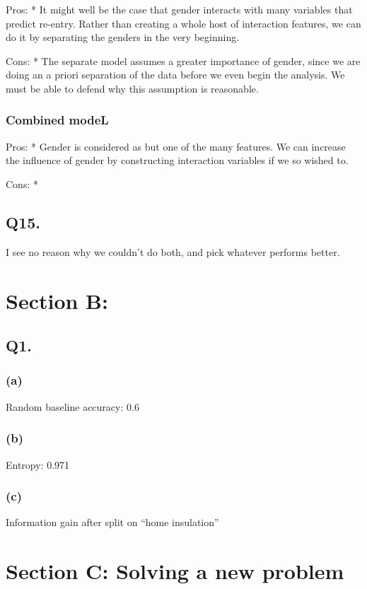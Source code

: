 \documentclass[]{article}
\begin{document}
Pros: * It might well be the case that gender interacts with many
variables that predict re-entry. Rather than creating a whole host of
interaction features, we can do it by separating the genders in the very
beginning.

Cons: * The separate model assumes a greater importance of gender, since
we are doing an a priori separation of the data before we even begin the
analysis. We must be able to defend why this assumption is reasonable.

\hypertarget{combined-model}{%
\subsubsection{Combined modeL}\label{combined-model}}

Pros: * Gender is considered as but one of the many features. We can
increase the influence of gender by constructing interaction variables
if we so wished to.

Cons: *

\hypertarget{q15.}{%
\subsection{Q15.}\label{q15.}}

I see no reason why we couldn't do both, and pick whatever performs
better.

\hypertarget{section-b}{%
\section{Section B:}\label{section-b}}

\hypertarget{q1.-1}{%
\subsection{Q1.}\label{q1.-1}}

\hypertarget{a}{%
\subsubsection{(a)}\label{a}}

Random baseline accuracy: 0.6

\hypertarget{b}{%
\subsubsection{(b)}\label{b}}

Entropy: 0.971

\hypertarget{c}{%
\subsubsection{(c)}\label{c}}

Information gain after split on ``home insulation''

\hypertarget{section-c-solving-a-new-problem}{%
\section{Section C: Solving a new
problem}\label{section-c-solving-a-new-problem}}
\end{document}
